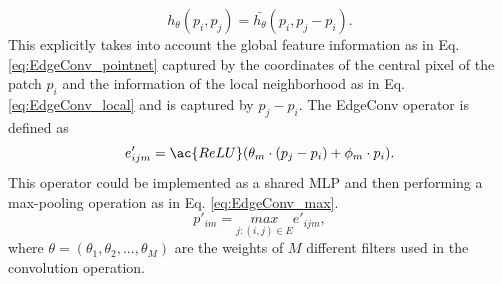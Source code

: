 \begin{equation}
    \label{eq:EdgeConv_asym}
    h_{\theta}(p_i, p_j) = \bar{h_{\theta}}(p_i, p_j-p_i).
\end{equation}
This explicitly takes into account the global feature information as in Eq.\ref{eq:EdgeConv_pointnet} captured by the coordinates of the central pixel of the patch $p_i$ and the information of the local neighborhood as in Eq. \ref{eq:EdgeConv_local} and is captured by $p_j-p_i$. The EdgeConv operator is defined as 
\begin{equation}
    \label{eq:EdgeConv_op}
    e'_{ijm} = \ac{ReLU}(\theta _m \cdot (p_j - p_i) + \phi _m \cdot p_i).
\end{equation}
This operator could be implemented as a shared \ac{MLP} and then performing a max-pooling operation as in Eq. \ref{eq:EdgeConv_max}.
\begin{equation}
    \label{eq:EdgeConv_max}
    p'_{im} = \underset{j:(i,j) \in E}{max}e'_{ijm},
\end{equation}
where $\theta = (\theta _1, \theta _2, ... , \theta _M)$ are the weights of $M$ different filters used in the convolution operation.

\vspace{5mm}

